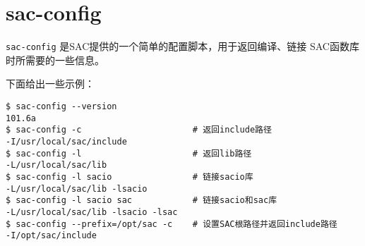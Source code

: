 \section{sac-config}
\label{sec:sac-config}

\texttt{sac-config} 是SAC提供的一个简单的配置脚本，用于返回编译、链接
SAC函数库时所需要的一些信息。

下面给出一些示例：
\begin{verbatim}
$ sac-config --version
101.6a
$ sac-config -c                      # 返回include路径
-I/usr/local/sac/include
$ sac-config -l                      # 返回lib路径
-L/usr/local/sac/lib
$ sac-config -l sacio                # 链接sacio库
-L/usr/local/sac/lib -lsacio
$ sac-config -l sacio sac            # 链接sacio和sac库
-L/usr/local/sac/lib -lsacio -lsac
$ sac-config --prefix=/opt/sac -c    # 设置SAC根路径并返回include路径
-I/opt/sac/include
\end{verbatim}
